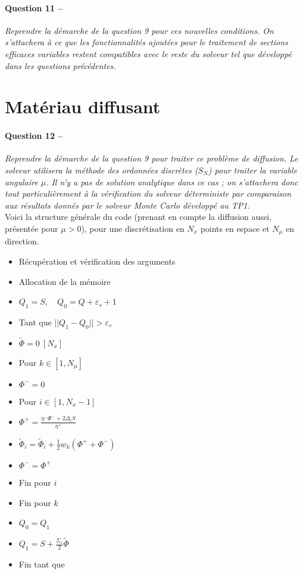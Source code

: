 \documentclass[11pt,a4paper]{article}
\newcommand{\norm}[1]{\big|\big|#1\big|\big|}
\newcommand{\question}[2]{\paragraph{Question #1 --}\hspace{-7pt}\textit{#2} \\}
\newcommand{\Phit}{\widetilde{\Phi}}
\begin{document}
\question{11}{Reprendre la démarche de la question 9 pour ces nouvelles conditions.
On s'attachera à ce que les fonctionnalités ajoutées pour le traitement de sections efficaces variables restent compatibles avec le reste du solveur tel que développé dans les questions précédentes.}

\section{Matériau diffusant}

\question{12}{Reprendre la démarche de la question 9 pour traiter ce problème de diffusion.
Le solveur utilisera la méthode des ordonnées discrètes ($S_N$) pour traiter la variable angulaire $\mu$.
Il n'y a pas de solution analytique dans ce cas ; on s'attachera donc tout particulièrement à la vérification du solveur déterministe par comparaison aux résultats donnés par le solveur Monte Carlo développé au TP1.}

Voici la structure générale du code (prenant en compte la diffusion aussi, présentée pour $\mu>0$), pour une discrétisation en $N_x$ points en espace et $N_{\mu}$ en direction.

\begin{itemize}
\item Récupération et vérification des arguments
\item Allocation de la mémoire
\item $Q_1 = S, \quad Q_0 = Q + \varepsilon_s +1$
\item[\textcolor{red}{\textbullet}] Tant que $\norm{Q_1 - Q_0}>\varepsilon_s$
  \setlength\itemindent{35pt}
\item $\Phit=0~[N_x]$
\item[\textcolor{red}{\textbullet}] Pour $k\in[1,N_{\mu}]$
  \setlength\itemindent{70pt}
\item $\Phi^- = 0$
\item[\textcolor{red}{\textbullet}] Pour $i\in[1, N_x-1]$
  \setlength\itemindent{105pt}
\item $\Phi^+ = \frac{\eta^- \Phi^- + 2 \Delta_i S}{\eta^+}$
\item $\Phit_i =  \Phit_i + \frac{1}{2} w_k (\Phi^+ + \Phi^-)$
\item $\Phi^- = \Phi^+$
  \setlength\itemindent{70pt}
\item[\textcolor{red}{\textbullet}] Fin pour $i$
   \setlength\itemindent{35pt}
\item[\textcolor{red}{\textbullet}] Fin pour $k$ 
\item $Q_0 = Q_1$
\item $Q_1 = S + \frac{\Sigma_s}{2} \Phit$
   \setlength\itemindent{0pt}
\item[\textcolor{red}{\textbullet}] Fin tant que  
\end{itemize}
 
\end{document}
